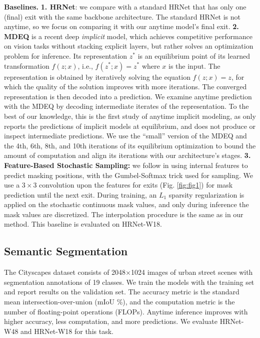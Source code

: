 \documentclass{article} %
\renewcommand{\cite}{\citep}
\begin{document}
\noindent\textbf{Baselines.}
\textbf{1. HRNet}: we compare with a standard HRNet that has only one (final) exit with the same backbone architecture.
The standard HRNet is not anytime, so we focus on comparing it with our anytime model's final exit.
\textbf{2. MDEQ} \cite{bai2020multiscale} is a recent deep \emph{implicit} model, which achieves competitive performance on vision tasks without stacking explicit layers, but rather solves an optimization problem for inference. 
Its representation $z^*$ is an equilibrium point of its learned transformation $f(z; x)$, i.e., $f(z^*; x) = z^*$ where $x$ is the input.
The representation is obtained by iteratively solving the equation $f(z; x) = z$, for which the quality of the solution improves with more iterations.
The converged representation is then decoded into a prediction.
We examine anytime prediction with the MDEQ by decoding intermediate iterates of the representation. 
To the best of our knowledge, this is the first study of anytime implicit modeling, as \cite{bai2020multiscale} only reports the predictions of implicit models at equilibrium, and does not produce or inspect intermediate predictions.
We use the ``small'' version of the MDEQ \cite{bai2020multiscale} and the 4th, 6th, 8th, and 10th iterations of its equilibrium optimization to bound the amount of computation and align its iterations with our architecture's stages. 
\textbf{3. Feature-Based Stochastic Sampling:} we follow \citet{xie2020spatially} in using internal features to predict masking positions, with the Gumbel-Softmax trick \cite{jang2016categorical} used for sampling. We use a $3\times3$ convolution upon the features for exits (Fig. \ref{fig:fig1}) for mask prediction until the next exit. During training, an $L_1$ sparsity regularization is applied on the stochastic continuous mask values, and only during inference the mask values are discretized. The interpolation procedure is the same as in our method. This baseline is evaluated on HRNet-W18.

\subsection{Semantic Segmentation}
The Cityscapes dataset \cite{cordts2016cityscapes} consists of 2048$\times$1024 images of urban street scenes with segmentation annotations of 19 classes.
We train the models with the training set and report results on the validation set.
The accuracy metric is the standard mean intersection-over-union (mIoU \%), and the computation metric is the number of floating-point operations (FLOPs).
Anytime inference improves with higher accuracy, less computation, and more predictions.
We evaluate HRNet-W48 and HRNet-W18 for this task.
\end{document}
